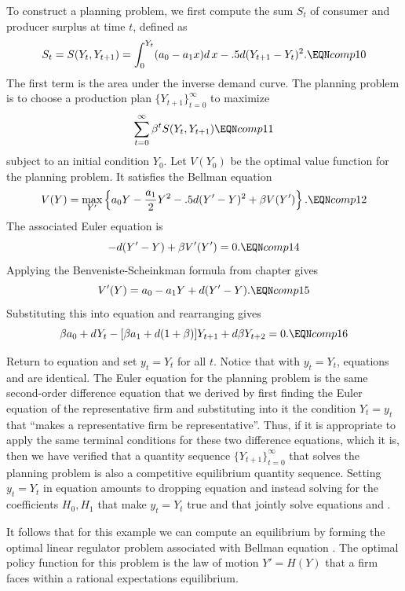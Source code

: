 To construct a planning problem, we first compute
the sum $S_t$ of  consumer and producer surplus at time $t$, defined as
$$ S_t = S(Y_t, Y_{t+1}) = \int_0^{Y_t} (a_0 - a_1 x) d \, x
      -.5 d (Y_{t+1} - Y_t)^2. \EQN comp10 $$
The first term is the area under the inverse demand curve.
The planning problem is to choose a production
plan $\{Y_{t+1}\}_{t=0}^\infty$ to maximize
$$   \sum_{t=0}^\infty \beta^t S(Y_t, Y_{t+1}) \EQN comp11 $$
subject to an initial condition $Y_0$.
Let $V(Y_0)$ be the optimal value function for the planning problem. It satisfies
the Bellman equation 
$$ V(Y) = \max_{Y'}\left\{a_0  Y - {a_1 \over 2} Y^2 - .5 d (Y' - Y)^2
     + \beta V(Y') \right\}. \EQN comp12 $$
The associated Euler equation is
$$ - d(Y' - Y) + \beta V'(Y') = 0. \EQN comp14 $$
Applying the Benveniste-Scheinkman formula from chapter  %
  gives
$$ V'(Y) = a_0 - a_1 Y + d(Y' - Y) . \EQN comp15 $$
Substituting this into equation  and rearranging gives
$$ \beta a_0 + d Y_t - [\beta a_1 + d(1+ \beta)]Y_{t+1} + d \beta Y_{t+2} =0 .
         \EQN comp16 $$

Return to equation
 and set $y_t = Y_t$ for all $t$. 
Notice that with $y_t=Y_t$, equations  and  are identical.
The Euler equation for the planning problem is the same  second-order difference equation
that we derived by first finding the Euler equation of the representative firm and substituting into
it the condition  $Y_t =  y_t$ that ``makes a representative firm be representative''.  Thus, if
 it is appropriate to apply  the same terminal conditions for these two difference equations, which it is,
then we have verified that  a quantity sequence $\{Y_{t+1}\}_{t=0}^\infty$ that solves the planning problem is also  a competitive  equilibrium
quantity sequence.
Setting $y_t = Y_t$ in
equation  amounts to dropping equation  and instead
solving for the coefficients $H_0, H_1$ that make
$y_t = Y_t$ true and that jointly solve equations
 and .

It follows that for this example we can compute an equilibrium
by forming the optimal linear regulator problem associated with  Bellman equation .    The optimal policy
function for this problem is the  law of motion $Y'=H(Y)$ that a firm faces within a rational
expectations equilibrium. 
